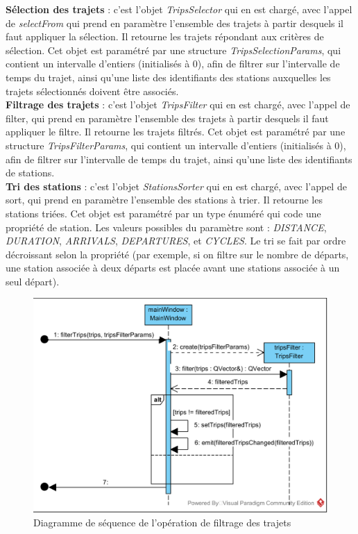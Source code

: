 \documentclass[12pt]{article}
\begin{document}
	\textbf{Sélection des trajets} : c’est l’objet \textit{TripsSelector} qui en est chargé, avec l’appel de \textit{selectFrom} qui prend en paramètre l’ensemble des trajets à partir desquels il faut appliquer la sélection. Il retourne les trajets répondant aux critères de sélection. Cet objet est paramétré par une structure \textit{TripsSelectionParams}, qui contient un intervalle d’entiers (initialisés à 0), afin de filtrer sur l’intervalle de temps du trajet, ainsi qu’une liste des identifiants des stations auxquelles les trajets sélectionnés doivent être associés.\\

	\textbf{Filtrage des trajets} : c’est l’objet \textit{TripsFilter} qui en est chargé, avec l’appel de filter, qui prend en paramètre l’ensemble des trajets à partir desquels il faut appliquer le filtre. Il retourne les trajets filtrés. Cet objet est paramétré par une structure \textit{TripsFilterParams}, qui contient un intervalle d’entiers (initialisés à 0), afin de filtrer sur l’intervalle de temps du trajet, ainsi qu’une liste des identifiants de stations.\\

	\textbf{Tri des stations} : c’est l’objet \textit{StationsSorter} qui en est chargé, avec l’appel de sort, qui prend en paramètre l’ensemble des stations à trier. Il retourne les stations triées. Cet objet est paramétré par un type énuméré qui code une propriété de station. Les valeurs possibles du paramètre sont : \textit{DISTANCE}, \textit{DURATION}, \textit{ARRIVALS}, \textit{DEPARTURES}, et \textit{CYCLES}. Le tri se fait par ordre décroissant selon la propriété (par exemple, si on filtre sur le nombre de départs, une station associée à deux départs est placée avant une stations associée à un seul départ).\\
	
	\begin{figure}[!h]
	\begin{center}
	\includegraphics[scale=1]{dia_sequence_filterTrips.png}
	\caption{Diagramme de séquence de l’opération de filtrage des trajets}
	\label{fig:filterTrips}
	\end{center}
	\end{figure}
\end{document}
